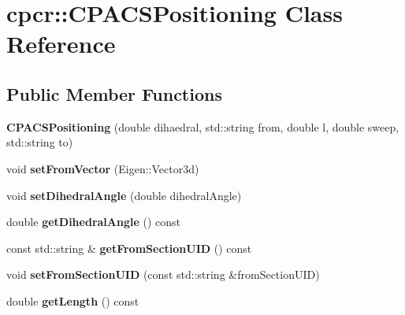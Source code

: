 \hypertarget{classcpcr_1_1CPACSPositioning}{\section{cpcr\-:\-:C\-P\-A\-C\-S\-Positioning Class Reference}
\label{classcpcr_1_1CPACSPositioning}
}
\subsection*{Public Member Functions}
\begin{DoxyCompactItemize}
\item 
\hypertarget{classcpcr_1_1CPACSPositioning_ae726f6cb8f7a668778a1956b180c7d5e}{{\bfseries C\-P\-A\-C\-S\-Positioning} (double dihaedral, std\-::string from, double l, double sweep, std\-::string to)}\label{classcpcr_1_1CPACSPositioning_ae726f6cb8f7a668778a1956b180c7d5e}

\item 
\hypertarget{classcpcr_1_1CPACSPositioning_a35e0fdf43d52bbd355f60848a1eb3c2f}{void {\bfseries set\-From\-Vector} (Eigen\-::\-Vector3d)}\label{classcpcr_1_1CPACSPositioning_a35e0fdf43d52bbd355f60848a1eb3c2f}

\item 
\hypertarget{classcpcr_1_1CPACSPositioning_a0f491ee063db7dcf2558ef08d1798d80}{void {\bfseries set\-Dihedral\-Angle} (double dihedral\-Angle)}\label{classcpcr_1_1CPACSPositioning_a0f491ee063db7dcf2558ef08d1798d80}

\item 
\hypertarget{classcpcr_1_1CPACSPositioning_a3d18f8505af7922695adc3da9dfd7c55}{double {\bfseries get\-Dihedral\-Angle} () const }\label{classcpcr_1_1CPACSPositioning_a3d18f8505af7922695adc3da9dfd7c55}

\item 
\hypertarget{classcpcr_1_1CPACSPositioning_a7b325efe862703c7b7eba38cd8eb8519}{const std\-::string \& {\bfseries get\-From\-Section\-U\-I\-D} () const }\label{classcpcr_1_1CPACSPositioning_a7b325efe862703c7b7eba38cd8eb8519}

\item 
\hypertarget{classcpcr_1_1CPACSPositioning_aebda9b3b5afddc7eab7c355b9a24a1b0}{void {\bfseries set\-From\-Section\-U\-I\-D} (const std\-::string \&from\-Section\-U\-I\-D)}\label{classcpcr_1_1CPACSPositioning_aebda9b3b5afddc7eab7c355b9a24a1b0}

\item 
\hypertarget{classcpcr_1_1CPACSPositioning_a301b37d4c0e7e3042d912e215ce64452}{double {\bfseries get\-Length} () const }\label{classcpcr_1_1CPACSPositioning_a301b37d4c0e7e3042d912e215ce64452}


\end{DoxyCompactItemize}
